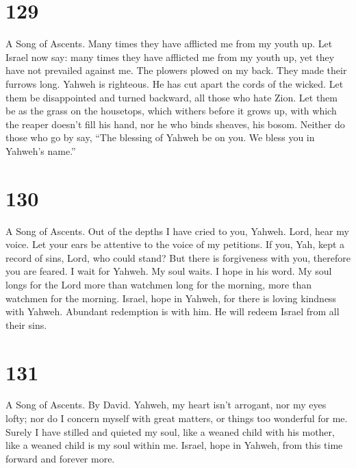 \hypertarget{section-119}{%
\section{129}\label{section-119}}

A Song of Ascents.  Many times they have afflicted me from
my youth up. Let Israel now say:  many times they have
afflicted me from my youth up, yet they have not prevailed against me.
 The plowers plowed on my back. They made their furrows
long.  Yahweh is righteous. He has cut apart the cords of
the wicked.  Let them be disappointed and turned backward,
all those who hate Zion.  Let them be as the grass on the
housetops, which withers before it grows up,  with which the
reaper doesn't fill his hand, nor he who binds sheaves, his bosom.
 Neither do those who go by say, ``The blessing of Yahweh be
on you. We bless you in Yahweh's name.''

\hypertarget{section-120}{%
\section{130}\label{section-120}}

A Song of Ascents.  Out of the depths I have cried to you,
Yahweh.  Lord, hear my voice. Let your ears be attentive to
the voice of my petitions.  If you, Yah, kept a record of
sins, Lord, who could stand?  But there is forgiveness with
you, therefore you are feared.  I wait for Yahweh. My soul
waits. I hope in his word.  My soul longs for the Lord more
than watchmen long for the morning, more than watchmen for the morning.
 Israel, hope in Yahweh, for there is loving kindness with
Yahweh. Abundant redemption is with him.  He will redeem
Israel from all their sins.

\hypertarget{section-121}{%
\section{131}\label{section-121}}

A Song of Ascents. By David.  Yahweh, my heart isn't
arrogant, nor my eyes lofty; nor do I concern myself with great matters,
or things too wonderful for me.  Surely I have stilled and
quieted my soul, like a weaned child with his mother, like a weaned
child is my soul within me.  Israel, hope in Yahweh, from
this time forward and forever more.

